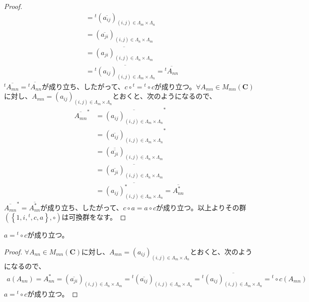 \documentclass[dvipdfmx]{jsarticle}
\begin{document}
\begin{proof}
\begin{align*}
&={}^{t}\left( \overline{a_{ij}} \right)_{(i,j) \in \varLambda_{m} \times \varLambda_{n}}\\
&= \left( \overline{a_{ji}} \right)_{(i,j) \in \varLambda_{n} \times \varLambda_{m}}\\
&= \overline{\left( a_{ji} \right)_{(i,j) \in \varLambda_{n} \times \varLambda_{m}}}\\
&= \overline{{}^{t}\left( a_{ij} \right)_{(i,j) \in \varLambda_{m} \times \varLambda_{n}}} = \overline{{}^{t}A_{nn}}
\end{align*}
${}^{t}\overline{A_{mn}} = \overline{{}^{t}A_{nn}}$が成り立ち、したがって、$c \circ{}^{t} ={}^{t} \circ c$が成り立つ。$\forall A_{mn} \in M_{mn}\left( \mathbf{C} \right)$に対し、$A_{mn} = \left( a_{ij} \right)_{(i,j) \in \varLambda_{m} \times \varLambda_{n}}$とおくと、次のようになるので、
\begin{align*}
{\overline{A_{mn}}}^{*} &= {\overline{\left( a_{ij} \right)_{(i,j) \in \varLambda_{m} \times \varLambda_{n}}}}^{*}\\
&= {\left( \overline{a_{ij}} \right)_{(i,j) \in \varLambda_{m} \times \varLambda_{n}}}^{*}\\
&= \left( \overline{\overline{a_{ji}}} \right)_{(i,j) \in \varLambda_{n} \times \varLambda_{m}}\\
&= \overline{\left( \overline{a_{ji}} \right)_{(i,j) \in \varLambda_{n} \times \varLambda_{m}}}\\
&= \overline{\left( a_{ij} \right)_{(i,j) \in \varLambda_{m} \times \varLambda_{n}}^{*}} = \overline{A_{nn}^{*}}
\end{align*}
${\overline{A_{mn}}}^{*} = \overline{A_{nn}^{*}}$が成り立ち、したがって、$c \circ a = a \circ c$が成り立つ。以上よりその群$\left( \left\{ 1,i,{}^{t},c,a \right\}, \circ \right)$は可換群をなす。
\end{proof}
\begin{thm}\label{2.1.3.15}
$a ={}^{t} \circ c$が成り立つ。
\end{thm}
\begin{proof}
$\forall A_{nn} \in M_{mn}\left( \mathbf{C} \right)$に対し、$A_{mn} = \left( a_{ij} \right)_{(i,j) \in \varLambda_{m} \times \varLambda_{n}}$とおくと、次のようになるので、
\begin{align*}
a\left( A_{nn} \right) = A_{nn}^{*} = \left( \overline{a_{ji}} \right)_{(i,j) \in \varLambda_{n} \times \varLambda_{m}} ={}^{t}\left( \overline{a_{ij}} \right)_{(i,j) \in \varLambda_{m} \times \varLambda_{n}} ={}^{t}\overline{\left( a_{ij} \right)_{(i,j) \in \varLambda_{m} \times \varLambda_{n}}} ={}^{t} \circ c\left( A_{mn} \right)
\end{align*}
$a ={}^{t} \circ c$が成り立つ。
\end{proof}
\end{document}
